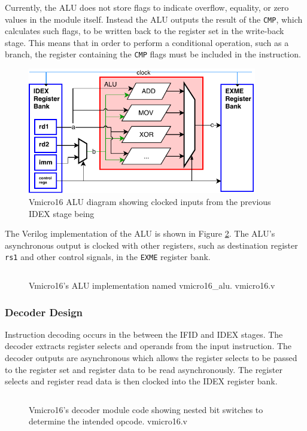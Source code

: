 \documentclass[11pt,a4paper]{report}
\begin{document}
{Currently, the ALU does not store flags to indicate overflow, equality, or zero values in the module itself. Instead the ALU outputs the result of the \verb|CMP|, which calculates such flags, to be written back to the register set in the write-back stage. This means that in order to perform a conditional operation, such as a branch, the register containing the \verb|CMP| flags must be included in the instruction.

\begin{figure}[H]
\centering 
\includegraphics[width=10cm]{../img/alu}
\caption{Vmicro16 ALU diagram showing clocked inputs from the previous IDEX stage being }
\label{fig:alu}
\end{figure}


The Verilog implementation of the ALU is shown in Figure \ref{fig:aluv}. The ALU's asynchronous output is clocked with other registers, such as destination register \verb|rs1| and other control signals, in the \verb|EXME| register bank.
\begin{figure}[H]
\centering
\inputminted[fontsize=\footnotesize,firstline=322,lastline=335,linenos]{verilog}{../../vmicro16/vmicro16.v}
\caption{Vmicro16's ALU implementation named vmicro16\_alu. vmicro16.v}
\label{fig:aluv}
\end{figure}




\subsubsection{Decoder Design}
Instruction decoding occurs in the between the IFID and IDEX stages. 
The decoder extracts register selects and operands from the input instruction. The decoder outputs are asynchronous which allows the register selects to be passed to the register set and register data to be read asynchronously. The register selects and register read data is then clocked into the IDEX register bank.

\begin{figure}[H]
\centering
\inputminted[fontsize=\footnotesize,firstline=224,lastline=245,linenos]{verilog}{../../vmicro16/vmicro16.v}
\caption{Vmicro16's decoder module code showing nested bit switches to determine the intended opcode. vmicro16.v}
\label{fig:decoder}
\end{figure}

}
\end{document}
